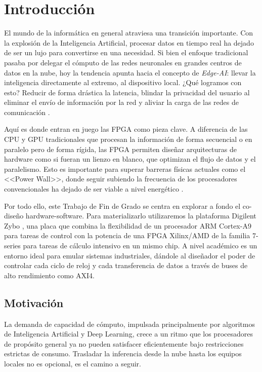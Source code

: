 \chapter{Introducción}
\label{cap:introduccion}

El mundo de la informática en general atraviesa una transición importante. Con la
explosión de la Inteligencia Artificial, procesar datos en tiempo real ha dejado de ser
un lujo para convertirse en una necesidad.
Si bien el enfoque tradicional pasaba por delegar el cómputo de las redes neuronales en
grandes centros de datos en la nube, hoy la tendencia apunta hacia el concepto de
\textit{Edge-AI}: llevar la inteligencia directamente al extremo, al dispositivo local.
¿Qué logramos con esto? Reducir de forma drástica la latencia, blindar la privacidad del
usuario al eliminar el envío de información por la red y aliviar la carga de las redes de
comunicación \citep{zhou2019edgeintelligencepavingmile}.

Aquí es donde entran en juego las \ac{FPGA} como pieza clave.
A diferencia de las \ac{CPU} y \ac{GPU} tradicionales que procesan la información de forma
secuencial o en paralelo pero de forma rígida, las \ac{FPGA} permiten diseñar arquitecturas
de hardware como si fueran un lienzo en blanco, que optimizan el flujo de datos y el
paralelismo. Esto es importante para superar barreras físicas
actuales como el <<Power Wall>>, donde seguir subiendo la frecuencia de
los procesadores convencionales ha dejado de ser viable a nivel energético
\citep{10.1145/3282307}.

Por todo ello, este Trabajo de Fin de Grado se centra en explorar a fondo el co-diseño
hardware-software.
Para materializarlo utilizaremos la plataforma Digilent Zybo \citep{digilentZyboOverview},
una placa que combina la flexibilidad de un procesador \ac{ARM} Cortex-A9 para tareas de
control con la potencia de una \ac{FPGA} Xilinx/AMD de la familia 7-series para tareas de
cálculo intensivo en un mismo chip. A nivel académico es un entorno ideal para emular
sistemas industriales, dándole al diseñador el poder de controlar cada ciclo de reloj y
cada transferencia de datos a través de buses de alto rendimiento como AXI4.

\section{Motivación}
La demanda de capacidad de cómputo, impulsada principalmente por algoritmos de
Inteligencia Artificial y Deep Learning, crece a un ritmo que los procesadores de
propósito general ya no pueden satisfacer eficientemente bajo restricciones estrictas de
consumo. Trasladar la inferencia desde la nube hasta los equipos locales no es opcional,
es el camino a seguir.

